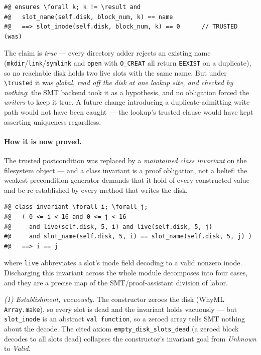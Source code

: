 \documentclass[11pt]{article}
\newcommand{\whyml}{\textsf{WhyML}}
\begin{document}
\begin{lstlisting}
#@ ensures \forall k; k != \result and
#@   slot_name(self.disk, block_num, k) == name
#@   ==> slot_inode(self.disk, block_num, k) == 0      // TRUSTED (was)
\end{lstlisting}

\noindent
The claim is \emph{true} --- every directory adder rejects an existing name
(\texttt{mkdir}/\texttt{link}/\texttt{symlink} and \texttt{open} with
\texttt{O\_CREAT} all return \texttt{EEXIST} on a duplicate), so no reachable
disk holds two live slots with the same name. But under
\texttt{\textbackslash trusted} it was \emph{global, read off the disk at one
lookup site, and checked by nothing}: the SMT backend took it as a hypothesis,
and no obligation forced the \emph{writers} to keep it true. A future change
introducing a duplicate-admitting write path would not have been caught --- the
lookup's trusted clause would have kept asserting uniqueness regardless.

\paragraph{How it is now proved.}
The trusted postcondition was replaced by a \emph{maintained class invariant}
on the filesystem object --- and a class invariant is a proof obligation, not a
belief: the weakest-precondition generator demands that it hold of every
constructed value and be re-established by every method that writes the disk.

\begin{lstlisting}
#@ class invariant \forall i; \forall j;
#@   ( 0 <= i < 16 and 0 <= j < 16
#@     and live(self.disk, 5, i) and live(self.disk, 5, j)
#@     and slot_name(self.disk, 5, i) == slot_name(self.disk, 5, j) )
#@   ==> i == j
\end{lstlisting}

\noindent
where \texttt{live} abbreviates a slot's inode field decoding to a valid nonzero
inode. Discharging this invariant across the whole module decomposes into four
cases, and they are a precise map of the SMT/proof-assistant division of labor.

\emph{(1) Establishment, vacuously.} The constructor zeroes the disk
(\whyml{} \texttt{Array.make}), so every slot is dead and the invariant holds
vacuously --- but \texttt{slot\_inode} is an abstract \texttt{val function}, so
a zeroed array tells SMT nothing about the decode. The cited axiom
\texttt{empty\_disk\_slots\_dead} (a zeroed block decodes to all slots dead)
collapses the constructor's invariant goal from \emph{Unknown} to \emph{Valid}.
\end{document}
